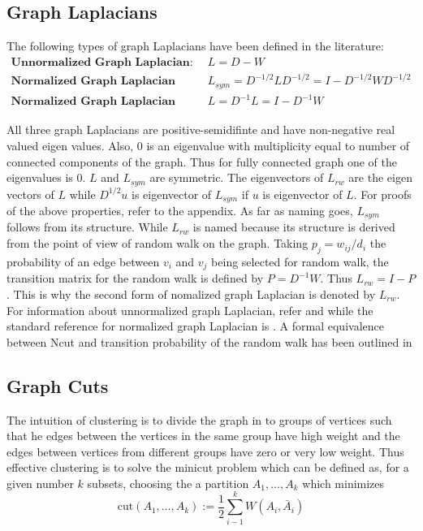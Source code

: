 \documentclass[10pt,a4paper, nocenter]{report}
\begin{document}
    \subsection{Graph Laplacians}
        The following types of graph Laplacians have been defined in the literature:
        \begin{align*}
         \textbf{Unnormalized Graph Laplacian: } &L = D- W \\
         \textbf{Normalized Graph Laplacian (Symmetric): } &L_{sym} = D^{-1/2}LD^{-1/2} = I - D^{-1/2}WD^{-1/2} \\
         \textbf{Normalized Graph Laplacian (Raondom walk): } &L = D^{-1}L = I - D^{-1}W 
        \end{align*}

        All three graph Laplacians are positive-semidifinte and have non-negative real valued eigen values. Also, 0 is an eigenvalue with multiplicity equal to number of connected components of the graph. Thus for fully connected graph one of the eigenvalues is 0. $L$ and $L_{sym}$ are symmetric. The eigenvectors of $L_{rw}$ are the eigen vectors of $L$ while $D^{1/2}u$ is eigenvector of $L_{sym}$ if $u$ is eigenvector of $L$. For proofs of the above properties, refer to the appendix. As far as naming goes, $L_{sym}$ follows from its structure. While $L_{rw}$ is named because its structure is derived from the point of view of random walk on the graph. Taking $p_j = w_{ij}/d_i$ the probability of an edge between $v_i$ and $v_j$ being selected for random walk, the transition matrix for the random walk is defined by $P = D^{-1}W$. Thus $L_{rw} = I-P$. This is why the second form of nomalized graph Laplacian is denoted by $L_{rw}$. For information about unnormalized graph Laplacian, refer \cite{mohar-1991} and \cite{mohar-1997} while the standard reference for normalized graph Laplacian is \cite{graph-spectral-book}. A formal equivalence between Ncut and transition probability of the random walk has been outlined in \cite{Meila01arandom}

    \subsection{Graph Cuts}
        The intuition of clustering is to divide the graph in to groups of vertices such that he edges between the vertices in the same group have high weight and the edges between vertices from different groups have zero or very low weight. Thus effective clustering is to solve the minicut problem which can be defined as, for a given number $k$ subsets, choosing the a partition $A_{1}, \dots, A_{k}$ which minimizes $$ \text{cut}(A_{1}, \dots, A_{k}) := \frac{1}{2}\sum_{i-1}^{k}W(A_i,\bar{A}_{i}) $$
\end{document}
